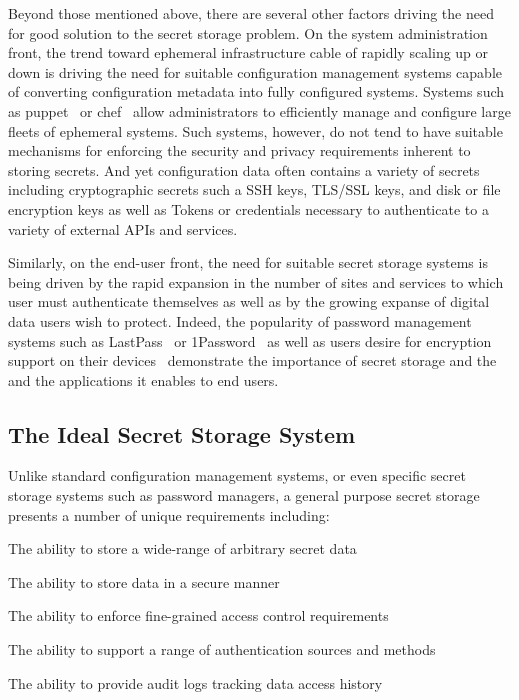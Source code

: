 Beyond those mentioned above, there are several other factors driving
the need for good solution to the secret storage problem. On the
system administration front, the trend toward ephemeral infrastructure
cable of rapidly scaling up or down is driving the need for suitable
configuration management systems capable of converting configuration
metadata into fully configured systems. Systems such as
puppet~\cite{puppet} or chef~\cite{chef} allow administrators to
efficiently manage and configure large fleets of ephemeral
systems. Such systems, however, do not tend to have suitable
mechanisms for enforcing the security and privacy requirements
inherent to storing secrets. And yet configuration data often contains
a variety of secrets including cryptographic secrets such a SSH keys,
TLS/SSL keys, and disk or file encryption keys as well as Tokens or
credentials necessary to authenticate to a variety of external APIs
and services.

Similarly, on the end-user front, the need for suitable secret storage
systems is being driven by the rapid expansion in the number of sites
and services to which user must authenticate themselves as well as by
the growing expanse of digital data users wish to protect. Indeed, the
popularity of password management systems such as
LastPass~\cite{lastpass} or 1Password~\cite{onepassword} as well as
users desire for encryption support on their
devices~\cite{intercept-cookencryption} demonstrate the importance of
secret storage and the and the applications it enables to end users.

\subsection{The Ideal Secret Storage System}

Unlike standard configuration management systems, or even specific
secret storage systems such as password managers, a general purpose
secret storage presents a number of unique requirements including:

\begin{packed_item}
\item The ability to store a wide-range of arbitrary secret data
\item The ability to store data in a secure manner
\item The ability to enforce fine-grained access control requirements
\item The ability to support a range of authentication sources and methods
\item The ability to provide audit logs tracking data access history
\end{packed_item}

